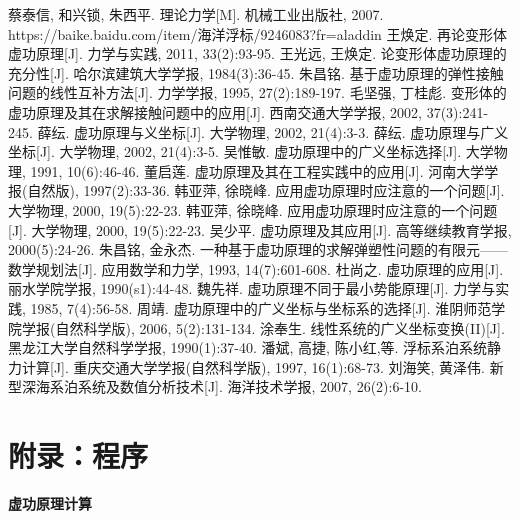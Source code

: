 \documentclass[withoutpreface,bwprint]{cumcmthesis} %
\begin{document}
\begin{thebibliography}{9}%
  蔡泰信, 和兴锁, 朱西平. 理论力学[M]. 机械工业出版社, 2007.
  https://baike.baidu.com/item/海洋浮标/9246083?fr=aladdin
  王焕定. 再论变形体虚功原理[J]. 力学与实践, 2011, 33(2):93-95.
  王光远, 王焕定. 论变形体虚功原理的充分性[J]. 哈尔滨建筑大学学报, 1984(3):36-45.
  朱昌铭. 基于虚功原理的弹性接触问题的线性互补方法[J]. 力学学报, 1995, 27(2):189-197.
  毛坚强, 丁桂彪. 变形体的虚功原理及其在求解接触问题中的应用[J]. 西南交通大学学报, 2002, 37(3):241-245.
  薛纭. 虚功原理与义坐标[J]. 大学物理, 2002, 21(4):3-3.
  薛纭. 虚功原理与广义坐标[J]. 大学物理, 2002, 21(4):3-5.
  吴惟敏. 虚功原理中的广义坐标选择[J]. 大学物理, 1991, 10(6):46-46.
  董启莲. 虚功原理及其在工程实践中的应用[J]. 河南大学学报(自然版), 1997(2):33-36.
  韩亚萍, 徐晓峰. 应用虚功原理时应注意的一个问题[J]. 大学物理, 2000, 19(5):22-23.
  韩亚萍, 徐晓峰. 应用虚功原理时应注意的一个问题[J]. 大学物理, 2000, 19(5):22-23.
  吴少平. 虚功原理及其应用[J]. 高等继续教育学报, 2000(5):24-26.
  朱昌铭, 金永杰. 一种基于虚功原理的求解弹塑性问题的有限元——数学规划法[J]. 应用数学和力学, 1993, 14(7):601-608.
  杜尚之. 虚功原理的应用[J]. 丽水学院学报, 1990(s1):44-48.
  魏先祥. 虚功原理不同于最小势能原理[J]. 力学与实践, 1985, 7(4):56-58.
  周靖. 虚功原理中的广义坐标与坐标系的选择[J]. 淮阴师范学院学报(自然科学版), 2006, 5(2):131-134.
  涂奉生. 线性系统的广义坐标变换(II)[J]. 黑龙江大学自然科学学报, 1990(1):37-40.
  潘斌, 高捷, 陈小红,等. 浮标系泊系统静力计算[J]. 重庆交通大学学报(自然科学版), 1997, 16(1):68-73.
  刘海笑, 黄泽伟. 新型深海系泊系统及数值分析技术[J]. 海洋技术学报, 2007, 26(2):6-10.
  
\end{thebibliography}

\section{附录：程序}

\textbf{虚功原理计算}

\end{document}
